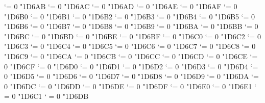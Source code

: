 {  \Umathcode `\Δ = 0 \normalfam "1D6AB 
  \Umathcode `\Ε = 0 \normalfam "1D6AC 
  \Umathcode `\Ζ = 0 \normalfam "1D6AD 
  \Umathcode `\Η = 0 \normalfam "1D6AE 
  \Umathcode `\Θ = 0 \normalfam "1D6AF 
  \Umathcode `\Ι = 0 \normalfam "1D6B0 
  \Umathcode `\Κ = 0 \normalfam "1D6B1 
  \Umathcode `\Λ = 0 \normalfam "1D6B2 
  \Umathcode `\Μ = 0 \normalfam "1D6B3 
  \Umathcode `\Ν = 0 \normalfam "1D6B4 
  \Umathcode `\Ξ = 0 \normalfam "1D6B5 
  \Umathcode `\Ο = 0 \normalfam "1D6B6 
  \Umathcode `\Π = 0 \normalfam "1D6B7 
  \Umathcode `\Ρ = 0 \normalfam "1D6B8 
  \Umathcode `\ϴ = 0 \normalfam "1D6B9 
  \Umathcode `\Σ = 0 \normalfam "1D6BA 
  \Umathcode `\Τ = 0 \normalfam "1D6BB 
  \Umathcode `\Υ = 0 \normalfam "1D6BC 
  \Umathcode `\Φ = 0 \normalfam "1D6BD 
  \Umathcode `\Χ = 0 \normalfam "1D6BE 
  \Umathcode `\Ψ = 0 \normalfam "1D6BF 
  \Umathcode `\Ω = 0 \normalfam "1D6C0 
  \Umathcode `\α = 0 \normalfam "1D6C2 
  \Umathcode `\β = 0 \normalfam "1D6C3 
  \Umathcode `\γ = 0 \normalfam "1D6C4 
  \Umathcode `\δ = 0 \normalfam "1D6C5 
  \Umathcode `\ε = 0 \normalfam "1D6C6 
  \Umathcode `\ζ = 0 \normalfam "1D6C7 
  \Umathcode `\η = 0 \normalfam "1D6C8 
  \Umathcode `\θ = 0 \normalfam "1D6C9 
  \Umathcode `\ι = 0 \normalfam "1D6CA 
  \Umathcode `\κ = 0 \normalfam "1D6CB 
  \Umathcode `\λ = 0 \normalfam "1D6CC 
  \Umathcode `\μ = 0 \normalfam "1D6CD 
  \Umathcode `\ν = 0 \normalfam "1D6CE 
  \Umathcode `\ξ = 0 \normalfam "1D6CF 
  \Umathcode `\ο = 0 \normalfam "1D6D0 
  \Umathcode `\π = 0 \normalfam "1D6D1 
  \Umathcode `\ρ = 0 \normalfam "1D6D2 
  \Umathcode `\ς = 0 \normalfam "1D6D3 
  \Umathcode `\σ = 0 \normalfam "1D6D4 
  \Umathcode `\τ = 0 \normalfam "1D6D5 
  \Umathcode `\υ = 0 \normalfam "1D6D6 
  \Umathcode `\φ = 0 \normalfam "1D6D7 
  \Umathcode `\χ = 0 \normalfam "1D6D8 
  \Umathcode `\ψ = 0 \normalfam "1D6D9 
  \Umathcode `\ω = 0 \normalfam "1D6DA 
  \Umathcode `\ϵ = 0 \normalfam "1D6DC 
  \Umathcode `\ϑ = 0 \normalfam "1D6DD 
  \Umathcode `\ϰ = 0 \normalfam "1D6DE 
  \Umathcode `\ϕ = 0 \normalfam "1D6DF 
  \Umathcode `\ϱ = 0 \normalfam "1D6E0 
  \Umathcode `\ϖ = 0 \normalfam "1D6E1 
  \Umathcode `\∇ = 0 \normalfam "1D6C1 
  \Umathcode `\∂ = 0 \normalfam "1D6DB 
\tenbf}%
